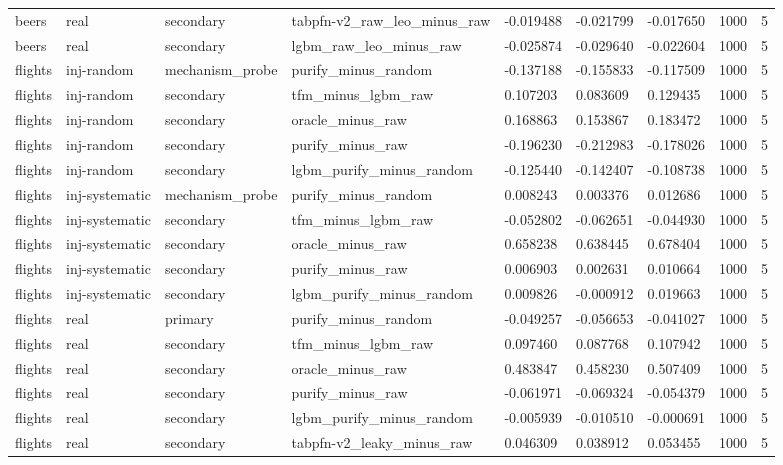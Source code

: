 \begin{tabular}{lllllllll}
beers & real & secondary & tabpfn-v2\_raw\_leo\_minus\_raw & -0.019488 & -0.021799 & -0.017650 & 1000 & 5 \\
beers & real & secondary & lgbm\_raw\_leo\_minus\_raw & -0.025874 & -0.029640 & -0.022604 & 1000 & 5 \\
flights & inj-random & mechanism\_probe & purify\_minus\_random & -0.137188 & -0.155833 & -0.117509 & 1000 & 5 \\
flights & inj-random & secondary & tfm\_minus\_lgbm\_raw & 0.107203 & 0.083609 & 0.129435 & 1000 & 5 \\
flights & inj-random & secondary & oracle\_minus\_raw & 0.168863 & 0.153867 & 0.183472 & 1000 & 5 \\
flights & inj-random & secondary & purify\_minus\_raw & -0.196230 & -0.212983 & -0.178026 & 1000 & 5 \\
flights & inj-random & secondary & lgbm\_purify\_minus\_random & -0.125440 & -0.142407 & -0.108738 & 1000 & 5 \\
flights & inj-systematic & mechanism\_probe & purify\_minus\_random & 0.008243 & 0.003376 & 0.012686 & 1000 & 5 \\
flights & inj-systematic & secondary & tfm\_minus\_lgbm\_raw & -0.052802 & -0.062651 & -0.044930 & 1000 & 5 \\
flights & inj-systematic & secondary & oracle\_minus\_raw & 0.658238 & 0.638445 & 0.678404 & 1000 & 5 \\
flights & inj-systematic & secondary & purify\_minus\_raw & 0.006903 & 0.002631 & 0.010664 & 1000 & 5 \\
flights & inj-systematic & secondary & lgbm\_purify\_minus\_random & 0.009826 & -0.000912 & 0.019663 & 1000 & 5 \\
flights & real & primary & purify\_minus\_random & -0.049257 & -0.056653 & -0.041027 & 1000 & 5 \\
flights & real & secondary & tfm\_minus\_lgbm\_raw & 0.097460 & 0.087768 & 0.107942 & 1000 & 5 \\
flights & real & secondary & oracle\_minus\_raw & 0.483847 & 0.458230 & 0.507409 & 1000 & 5 \\
flights & real & secondary & purify\_minus\_raw & -0.061971 & -0.069324 & -0.054379 & 1000 & 5 \\
flights & real & secondary & lgbm\_purify\_minus\_random & -0.005939 & -0.010510 & -0.000691 & 1000 & 5 \\
flights & real & secondary & tabpfn-v2\_leaky\_minus\_raw & 0.046309 & 0.038912 & 0.053455 & 1000 & 5 \\

\end{tabular}
